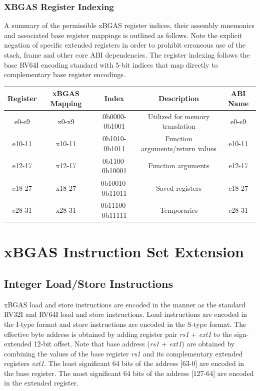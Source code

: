 \documentclass{article}
\begin{document}
\newpage
\subsubsection{XBGAS Register Indexing}
A summary of the permissible xBGAS register indices, their assembly 
mnemonics and associated base register mappings is outlined as follows.  
Note the explicit negation of specific extended registers in order to prohibit 
erroneous use of the stack, frame and other core ABI dependencies.  The register 
indexing follows the base RV64I encoding standard with 5-bit indices that 
map directly to complementary base register encodings.  

\begin{center}
\begin{tabular}{| c | c | c | c | c |}
\hline
Register & xBGAS Mapping & Index & Description & ABI Name\\ \hline
\hline
e0-e9 & x0-x9 & 0b0000-0b1001 & Utilized for memory translation & e0-e9\\
\hline
e10-11 & x10-11 & 0b1010-0b1011 & Function arguments/return values & e10-11\\
\hline
e12-17 & x12-17 & 0b1100-0b10001 & Function arguments & e12-17\\
\hline
e18-27 & x18-27 & 0b10010-0b11011 & Saved registers & e18-27\\
\hline
e28-31 & x28-31 & 0b11100-0b11111 & Temporaries & e28-31\\
\hline
\end{tabular}
\end{center}

\newpage
\section{xBGAS Instruction Set Extension}

\subsection{Integer Load/Store Instructions}

xBGAS load and store instructions are encoded in the manner as the standard RV32I and 
RV64I load and store instructions.  Load instructions are encoded in the I-type format and store 
instructions are encoded in the S-type format.  The effective byte address is obtained by adding 
register pair \textit{rs1} + \textit{ext1} to the sign-extended 12-bit offset.  Note that base address 
(\textit{rs1} + \textit{ext1}) are obtained by combining the values of the base register \textit{rs1} 
and its complementary extended registers \textit{ext1}.  The least significant 64 bits of the address
[63-0] are encoded in the base register.  The most significant 64 bits of the address [127-64] 
are encoded in the extended register.  
\end{document}
